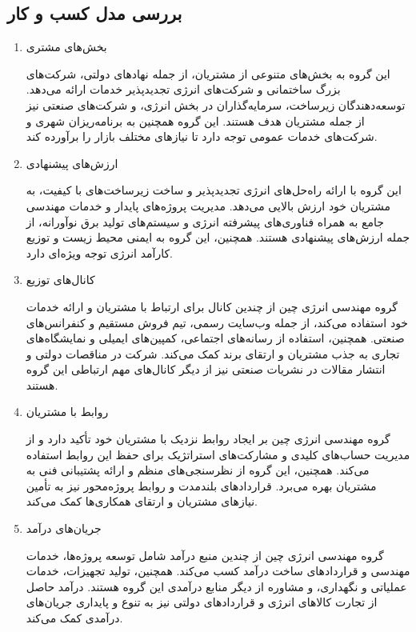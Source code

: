 \documentclass[dvipsnames, svgnames, x11names, 11pt, twocolumn]{article}
\begin{document}
\subsection{بررسی مدل کسب و کار}
\begin{enumerate}
\item 
بخش‌های مشتری

این گروه به بخش‌های متنوعی از مشتریان، از جمله نهادهای دولتی، شرکت‌های بزرگ ساختمانی و شرکت‌های انرژی تجدیدپذیر خدمات ارائه می‌دهد. توسعه‌دهندگان زیرساخت، سرمایه‌گذاران در بخش انرژی، و شرکت‌های صنعتی نیز از جمله مشتریان هدف هستند. این گروه همچنین به برنامه‌ریزان شهری و شرکت‌های خدمات عمومی توجه دارد تا نیازهای مختلف بازار را برآورده کند.

\item
ارزش‌های پیشنهادی

این گروه با ارائه راه‌حل‌های انرژی تجدیدپذیر و ساخت زیرساخت‌های با کیفیت، به مشتریان خود ارزش بالایی می‌دهد. مدیریت پروژه‌های پایدار و خدمات مهندسی جامع به همراه فناوری‌های پیشرفته انرژی و سیستم‌های تولید برق نوآورانه، از جمله ارزش‌های پیشنهادی هستند. همچنین، این گروه به ایمنی محیط زیست و توزیع کارآمد انرژی توجه ویژه‌ای دارد.

\item 
کانال‌های توزیع

گروه مهندسی انرژی چین از چندین کانال برای ارتباط با مشتریان و ارائه خدمات خود استفاده می‌کند، از جمله وب‌سایت رسمی، تیم فروش مستقیم و کنفرانس‌های صنعتی. همچنین، استفاده از رسانه‌های اجتماعی، کمپین‌های ایمیلی و نمایشگاه‌های تجاری به جذب مشتریان و ارتقای برند کمک می‌کند. شرکت در مناقصات دولتی و انتشار مقالات در نشریات صنعتی نیز از دیگر کانال‌های مهم ارتباطی این گروه هستند.

\item
روابط با مشتریان

گروه مهندسی انرژی چین بر ایجاد روابط نزدیک با مشتریان خود تأکید دارد و از مدیریت حساب‌های کلیدی و مشارکت‌های استراتژیک برای حفظ این روابط استفاده می‌کند. همچنین، این گروه از نظرسنجی‌های منظم و ارائه پشتیبانی فنی به مشتریان بهره می‌برد. قراردادهای بلندمدت و روابط پروژه‌محور نیز به تأمین نیازهای مشتریان و ارتقای همکاری‌ها کمک می‌کند.

\item
جریان‌های درآمد

گروه مهندسی انرژی چین از چندین منبع درآمد شامل توسعه پروژه‌ها، خدمات مهندسی و قراردادهای ساخت درآمد کسب می‌کند. همچنین، تولید تجهیزات، خدمات عملیاتی و نگهداری، و مشاوره از دیگر منابع درآمدی این گروه هستند. درآمد حاصل از تجارت کالاهای انرژی و قراردادهای دولتی نیز به تنوع و پایداری جریان‌های درآمدی کمک می‌کند.


\end{enumerate}
\end{document}
